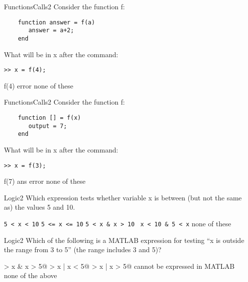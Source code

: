 \documentclass[master]{exam}
\begin{document}
\begin{problem}{FunctionsCalls}{2}
    Consider the function f:
    \begin{verbatim}
    function answer = f(a)
       answer = a+2;
    end
    \end{verbatim}
    What will be in x after the command:
    \begin{verbatim}>> x = f(4);
    \end{verbatim}
    
    \begin{answers}
        \answer f(4)
        \answer error
        \answer[fixed] none of these 
    \end{answers}
\end{problem}

\begin{problem}{FunctionsCalls}{2}
    Consider the function f:
    \begin{verbatim}
    function [] = f(x)
       output = 7;
    end
    \end{verbatim}
    What will be in x after the command:
    \begin{verbatim}>> x = f(3);\end{verbatim}
    
    \begin{answers}
        \answer f(7)
        \answer ans
        \answer[correct] error
        \answer[fixed] none of these 
    \end{answers}
\end{problem}

\begin{problem}{Logic}{2}
    Which expression tests whether
    variable x is between (but not the same as) the values 5 and 10.
    
    \begin{answers}
        \answer \verb+5 < x < 10+
        \answer \verb+5 <= x <= 10+
        \answer \verb+5 < x & x > 10 +
        \answer[correct] \verb+x < 10 & 5 < x+
        \answer[fixed] none of these 
    \end{answers}
\end{problem}

\begin{problem}{Logic}{2}
    Which of the following is a MATLAB expression for testing ``x is
    outside the range from 3 to 5'' (the range includes 3 and 5)? 
    
    \begin{answers}
        \answer {} > x & x > 5@
        \answer {} > x | x < 5@
        \answer[correct]  > x | x > 5@
        \answer[fixed] cannot be expressed in MATLAB
        \answer[fixed] none of the above 
    \end{answers}
\end{problem}
\end{document}
